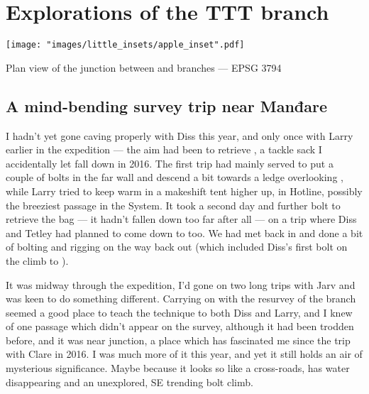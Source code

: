 \section{Explorations of the TTT branch}


\begin{marginsurvey}
	\texttt{[image: "images/little\_insets/apple\_inset".pdf]}
	\caption[Manđare junction]{Plan view of the \protect{} junction between \protect{} and \protect{} branches --- EPSG 3794}
\end{marginsurvey}

\subsection{A mind-bending survey trip near Manđare}
	I hadn't yet gone caving properly with Diss this year, and only once with Larry earlier in the expedition --- the aim had been to retrieve , a tackle sack I accidentally let fall down in 2016. The first trip had mainly served to put a couple of bolts in the far wall and descend a bit towards a ledge overlooking , while Larry tried to keep warm in a makeshift tent higher up, in Hotline, possibly the breeziest passage in the System. It took a second day and further bolt to retrieve the bag --- it hadn't fallen down too far after all --- on a trip where Diss and Tetley had planned to come down to  too. We had met back in  and done a bit of bolting and rigging on the way back out (which included Diss's first bolt on the climb to ).
	
	It was midway through the expedition, I'd gone on two long trips with Jarv and was keen to do something different. Carrying on with the resurvey of the  branch seemed a good place to teach the technique to both Diss and Larry, and I knew of one passage which didn't appear on the survey, although it had been trodden before, and it was near  junction, a place which has fascinated me since the trip with Clare in 2016. I was much more of it this year, and yet it still holds an air of mysterious significance. Maybe because it looks so like a cross-roads, has water disappearing and an unexplored, SE trending bolt climb. 
	

